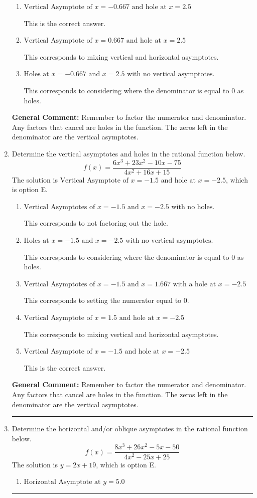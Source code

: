 \documentclass{extbook}[14pt]
\newcommand{\litem}[1]{\item #1

\rule{\textwidth}{0.4pt}}
\begin{document}
\begin{enumerate}
{\begin{enumerate}[label=\Alph*.]
This corresponds to setting the numerator equal to 0.
\item \( \text{Vertical Asymptote of } x = -0.667 \text{ and hole at } x = 2.5 \)

This is the correct answer.
\item \( \text{Vertical Asymptote of } x = 0.667 \text{ and hole at } x = 2.5 \)

This corresponds to mixing vertical and horizontal asymptotes.
\item \( \text{Holes at } x = -0.667 \text{ and } x = 2.5 \text{ with no vertical asymptotes.} \)

This corresponds to considering where the denominator is equal to 0 as holes.
\end{enumerate}

\textbf{General Comment:} Remember to factor the numerator and denominator. Any factors that cancel are holes in the function. The zeros left in the denominator are the vertical asymptotes.
}
\litem{
Determine the vertical asymptotes and holes in the rational function below.
\[ f(x) = \frac{6x^{3} +23 x^{2} -10 x -75}{4x^{2} +16 x + 15} \]The solution is \( \text{Vertical Asymptote of } x = -1.5 \text{ and hole at } x = -2.5 \), which is option E.\begin{enumerate}[label=\Alph*.]
\item \( \text{Vertical Asymptotes of } x = -1.5 \text{ and } x = -2.5 \text{ with no holes.} \)

This corresponds to not factoring out the hole.
\item \( \text{Holes at } x = -1.5 \text{ and } x = -2.5 \text{ with no vertical asymptotes.} \)

This corresponds to considering where the denominator is equal to 0 as holes.
\item \( \text{Vertical Asymptotes of } x = -1.5 \text{ and } x = 1.667 \text{ with a hole at } x = -2.5 \)

This corresponds to setting the numerator equal to 0.
\item \( \text{Vertical Asymptote of } x = 1.5 \text{ and hole at } x = -2.5 \)

This corresponds to mixing vertical and horizontal asymptotes.
\item \( \text{Vertical Asymptote of } x = -1.5 \text{ and hole at } x = -2.5 \)

This is the correct answer.
\end{enumerate}

\textbf{General Comment:} Remember to factor the numerator and denominator. Any factors that cancel are holes in the function. The zeros left in the denominator are the vertical asymptotes.
}
\litem{
Determine the horizontal and/or oblique asymptotes in the rational function below.
\[ f(x) = \frac{8x^{3} +26 x^{2} -5 x -50}{4x^{2} -25 x + 25} \]The solution is \( y = 2x + 19 \), which is option E.\begin{enumerate}[label=\Alph*.]
\item \( \text{Horizontal Asymptote at } y = 5.0 \)


\end{enumerate}}
\end{enumerate}
\end{document}
